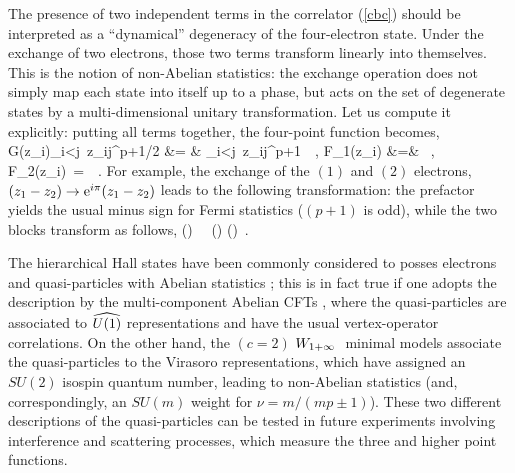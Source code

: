 The presence of two independent terms in the correlator (\ref{cbc})
should be interpreted as a ``dynamical'' degeneracy of the
four-electron state. Under the exchange of two electrons, those 
two terms transform linearly into themselves. This is 
the notion of non-Abelian statistics: the exchange operation does
not simply map each state into itself up to a phase, but
acts on the set of degenerate states by
a multi-dimensional unitary transformation.
Let us compute it explicitly: putting all terms together, the
four-point function becomes,
\barr
G(z_i)\times\prod_{i<j}\ z_{ij}^{p+1/2} &= &
\prod_{i<j}\ z_{ij}^{p+1}\ \ , \nl
{\cal F}_1(z_i) &=& \ ,\qquad
{\cal F}_2(z_i)\ =\ \ .
\label{elco}
\earr
For example, the exchange of the $(1)$ and $(2)$ electrons,
$(z_1 - z_2) \to {\rm e}^{i\pi}(z_1 - z_2)$ leads to the
following transformation: the prefactor yields the usual minus 
sign for Fermi statistics ($(p+1)$ is odd), while the two blocks 
transform as follows,
\beq
\left(\right)
\ \rightarrow\ 
\left(\right)
\left(\right)\ .
\label{naexp}\eeq

The hierarchical Hall states have been commonly considered to posses 
electrons and quasi-particles with Abelian statistics \cite{wen};
this is in fact true if one adopts the
description by the multi-component Abelian CFTs \cite{abe}, where the 
quasi-particles are associated to $\u1$ representations 
and have the usual vertex-operator correlations.
On the other hand, the $(c=2)$ $W_{1+\infty}\ $ minimal models associate the
quasi-particles to the Virasoro representations, which have assigned an
$SU(2)$ isospin quantum number, leading to non-Abelian 
statistics (and, correspondingly, an $SU(m)$ weight for $\nu=m/(mp\pm 1)$).
These two different descriptions of the quasi-particles
can be tested in future experiments
involving interference and scattering processes, which measure
the three and higher point functions.

